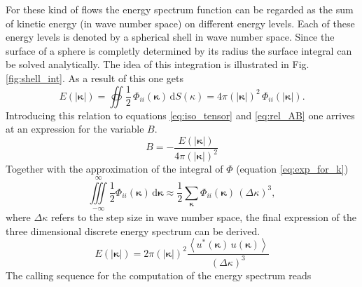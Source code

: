 \documentclass[preprint,12pt,ntfdMod]{elsarticle}
\begin{document}
\begin{par}
For these kind of flows the energy spectrum function can be regarded as the sum of kinetic energy
(in wave number space) on different energy levels. Each of these energy levels is denoted by a spherical
shell in wave number space. Since the surface of a sphere is completly determined by its radius the
surface integral can be solved analytically. The idea of this integration is illustrated
in Fig. \ref{fig:shell_int}.
As a result of this one gets
  \begin{equation}
      E(|\boldsymbol\kappa|)=\oiint\frac{1}{2}\,\Phi_{ii}(\boldsymbol\kappa)\,\mathrm{d}S(\kappa)
      =4\pi(|\boldsymbol\kappa|)^2\,\Phi_{ii}(|\boldsymbol\kappa|).
  \end{equation}
Introducing this relation to equations \eqref{eq:iso_tensor} and
\eqref{eq:rel_AB} one arrives at an expression for the variable $B$.
  \begin{equation}
      B=-\frac{E(|\boldsymbol\kappa|)}{4\pi(|\boldsymbol\kappa|)^2}
  \end{equation}
Together with the approximation of the integral of $\Phi$
(equation \eqref{eq:exp_for_k})
  \begin{equation}
      \iiint\limits_{-\infty}^{\infty}\frac{1}{2}\Phi_{ii}(\boldsymbol\kappa)\,\mathrm{d}\boldsymbol\kappa
      \approx\frac{1}{2}\sum\limits_{\boldsymbol\kappa}\Phi_{ii}(\boldsymbol\kappa)\,(\Delta\kappa)^3,
  \end{equation}
where $\Delta\kappa$ refers to the step size in wave number space,
the final expression of the three dimensional discrete energy spectrum can be derived.
  \begin{equation}
      E(|\boldsymbol\kappa|)=2\pi(|\boldsymbol\kappa|)^2\frac{\left<u^{*}
      (\boldsymbol\kappa)\,u(\boldsymbol\kappa)\right>}{(\Delta\kappa)^3}
  \end{equation}
The calling sequence for the computation of the energy spectrum reads
  \begin{figure}[t!]
      \centering

\end{figure}
\end{par}
\end{document}
